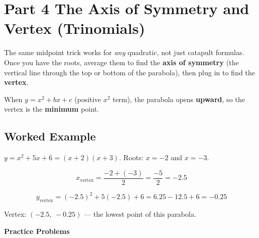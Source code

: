 \documentclass[12pt]{article}
\begin{document}
\newpage

\section*{Part 4 \quad The Axis of Symmetry and Vertex (Trinomials)}

\begin{conceptbox}
The same midpoint trick works for \emph{any} quadratic, not just catapult
formulas.  Once you have the roots, average them to find the
\textbf{axis of symmetry} (the vertical line through the top or bottom of
the parabola), then plug in to find the \textbf{vertex}.

\medskip
When $y = x^2 + bx + c$ (positive $x^2$ term), the parabola opens
\textbf{upward}, so the vertex is the \textbf{minimum} point.
\end{conceptbox}

\subsection*{Worked Example}

$y = x^2 + 5x + 6 = (x+2)(x+3)$. \quad Roots: $x = -2$ and $x = -3$.

\[
  x_{\text{vertex}} = \frac{-2 + (-3)}{2} = \frac{-5}{2} = -2.5
\]

\[
  y_{\text{vertex}} = (-2.5)^2 + 5(-2.5) + 6 = 6.25 - 12.5 + 6 = -0.25
\]

Vertex: $(-2.5,\ -0.25)$ --- the lowest point of this parabola.

\bigskip
\textbf{Practice Problems}
\end{document}
